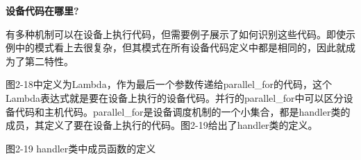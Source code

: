 \hspace*{\fill} \par %
\textbf{设备代码在哪里?}

有多种机制可以在设备上执行代码，但需要例子展示了如何识别这些代码。即使示例中的模式看上去很复杂，但其模式在所有设备代码定义中都是相同的，因此就成为了第二特性。\par

图2-18中定义为Lambda，作为最后一个参数传递给parallel\_for的代码，这个Lambda表达式就是要在设备上执行的设备代码。并行的parallel\_for中可以区分设备代码和主机代码。parallel\_for是设备调度机制的一个小集合，都是handler类的成员，其定义了要在设备上执行的代码。图2-19给出了handler类的定义。\par

\hspace*{\fill} \par %
图2-19 handler类中成员函数的定义
